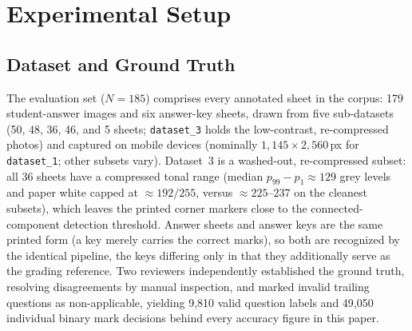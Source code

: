 \documentclass[conference]{IEEEtran}
\begin{document}
\section{Experimental Setup}

\subsection{Dataset and Ground Truth}
The evaluation set ($N{=}185$) comprises every annotated sheet in the
corpus: 179 student-answer images and six
answer-key sheets, drawn from five sub-datasets (50, 48, 36, 46, and 5
sheets; \texttt{dataset\_3} holds the low-contrast, re-compressed photos)
and captured on mobile devices (nominally $1{,}145\times2{,}560$\,px for
\texttt{dataset\_1}; other subsets vary).
Dataset~3 is a washed-out, re-compressed subset: all 36 sheets have a
compressed tonal range (median $p_{99}-p_{1}\approx129$ grey levels and paper
white capped at $\approx192/255$, versus $\approx225$–$237$ on the cleanest
subsets), which leaves the printed corner markers close to the
connected-component detection threshold. Answer sheets and answer keys
are the same printed form (a key merely carries the correct marks), so both
are recognized by the identical pipeline, the keys differing only in that
they additionally serve as the grading reference. Two reviewers independently established the ground truth, resolving
disagreements by manual inspection, and marked invalid trailing questions as
non-applicable, yielding 9{,}810 valid question labels and 49{,}050 individual
binary mark decisions behind every accuracy figure in this paper.
\end{document}
